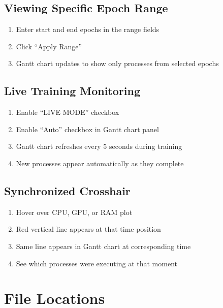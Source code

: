 \documentclass[11pt,a4paper]{article}
\begin{document}
\subsection{Viewing Specific Epoch Range}

\begin{enumerate}
    \item Enter start and end epochs in the range fields
    \item Click ``Apply Range''
    \item Gantt chart updates to show only processes from selected epochs
\end{enumerate}

\subsection{Live Training Monitoring}

\begin{enumerate}
    \item Enable ``LIVE MODE'' checkbox
    \item Enable ``Auto'' checkbox in Gantt chart panel
    \item Gantt chart refreshes every 5 seconds during training
    \item New processes appear automatically as they complete
\end{enumerate}

\subsection{Synchronized Crosshair}

\begin{enumerate}
    \item Hover over CPU, GPU, or RAM plot
    \item Red vertical line appears at that time position
    \item Same line appears in Gantt chart at corresponding time
    \item See which processes were executing at that moment
\end{enumerate}

\section{File Locations}
\end{document}

